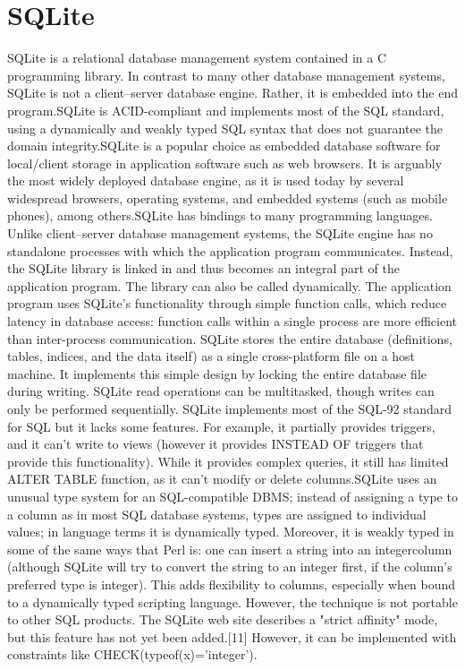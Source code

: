 \section{SQLite}
SQLite is a relational database management system contained in a C programming library. In contrast to many other database management systems, SQLite is not a client–server database engine. Rather, it is embedded into the end program.SQLite is ACID-compliant and implements most of the SQL standard, using a dynamically and weakly typed SQL syntax that does not guarantee the domain integrity.SQLite is a popular choice as embedded database software for local/client storage in application software such as web browsers. It is arguably the most widely deployed database engine, as it is used today by several widespread browsers, operating systems, and embedded systems (such as mobile phones), among others.SQLite has bindings to many programming languages.
Unlike client–server database management systems, the SQLite engine has no standalone processes with which the application program communicates. Instead, the SQLite library is linked in and thus becomes an integral part of the application program. The library can also be called dynamically. The application program uses SQLite's functionality through simple function calls, which reduce latency in database access: function calls within a single process are more efficient than inter-process communication. SQLite stores the entire database (definitions, tables, indices, and the data itself) as a single cross-platform file on a host machine. It implements this simple design by locking the entire database file during writing. SQLite read operations can be multitasked, though writes can only be performed sequentially.
SQLite implements most of the SQL-92 standard for SQL but it lacks some features. For example, it partially provides triggers, and it can't write to views (however it provides INSTEAD OF triggers that provide this functionality). While it provides complex queries, it still has limited ALTER TABLE function, as it can't modify or delete columns.SQLite uses an unusual type system for an SQL-compatible DBMS; instead of assigning a type to a column as in most SQL database systems, types are assigned to individual values; in language terms it is dynamically typed. Moreover, it is weakly typed in some of the same ways that Perl is: one can insert a string into an integercolumn (although SQLite will try to convert the string to an integer first, if the column's preferred type is integer). This adds flexibility to columns, especially when bound to a dynamically typed scripting language. However, the technique is not portable to other SQL products. The SQLite web site describes a "strict affinity" mode, but this feature has not yet been added.[11] However, it can be implemented with constraints like CHECK(typeof(x)='integer').


